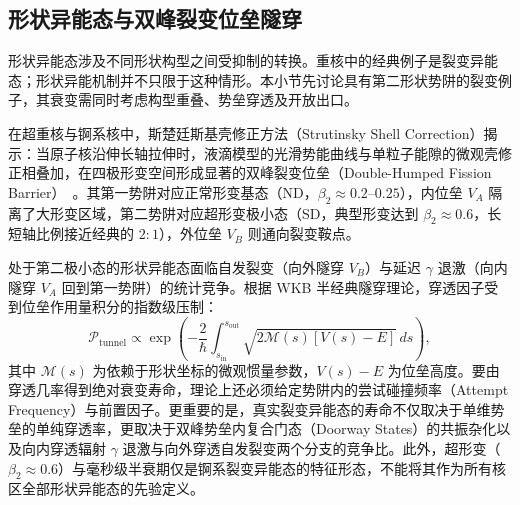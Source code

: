 \subsection{形状异能态与双峰裂变位垒隧穿}\label{sec:4-6-4}

形状异能态涉及不同形状构型之间受抑制的转换。重核中的经典例子是裂变异能态；形状异能机制并不只限于这种情形。本小节先讨论具有第二形状势阱的裂变例子，其衰变需同时考虑构型重叠、势垒穿透及开放出口。

在超重核与锕系核中，斯楚廷斯基壳修正方法（Strutinsky Shell Correction）揭示：当原子核沿伸长轴拉伸时，液滴模型的光滑势能曲线与单粒子能隙的微观壳修正相叠加，在四极形变空间形成显著的双峰裂变位垒（Double-Humped Fission Barrier）~\cite{book-jain-nuclear-isomers}。其第一势阱对应正常形变基态（ND，$\beta_2 \approx 0.2\text{--}0.25$），内位垒 $V_A$ 隔离了大形变区域，第二势阱对应超形变极小态（SD，典型形变达到 $\beta_2 \approx 0.6$，长短轴比例接近经典的 $2:1$），外位垒 $V_B$ 则通向裂变鞍点。

处于第二极小态的形状异能态面临自发裂变（向外隧穿 $V_B$）与延迟 $\gamma$ 退激（向内隧穿 $V_A$ 回到第一势阱）的统计竞争。根据 WKB 半经典隧穿理论，穿透因子受到位垒作用量积分的指数级压制：
\begin{equation}\label{eq:4-6-WKB-tunneling}
\mathcal{P}_{\mathrm{tunnel}} \propto \exp\left( -\frac{2}{\hbar} \int_{s_{\mathrm{in}}}^{s_{\mathrm{out}}} \sqrt{2 \mathcal{M}(s) \left[ V(s) - E \right]} \, ds \right),
\end{equation}
其中 $\mathcal{M}(s)$ 为依赖于形状坐标的微观惯量参数，$V(s) - E$ 为位垒高度。要由穿透几率得到绝对衰变寿命，理论上还必须给定势阱内的尝试碰撞频率（Attempt Frequency）与前置因子。更重要的是，真实裂变异能态的寿命不仅取决于单维势垒的单纯穿透率，更取决于双峰势垒内复合门态（Doorway States）的共振杂化以及向内穿透辐射 $\gamma$ 退激与向外穿透自发裂变两个分支的竞争比。此外，超形变（$\beta_2 \approx 0.6$）与毫秒级半衰期仅是锕系裂变异能态的特征形态，不能将其作为所有核区全部形状异能态的先验定义。

